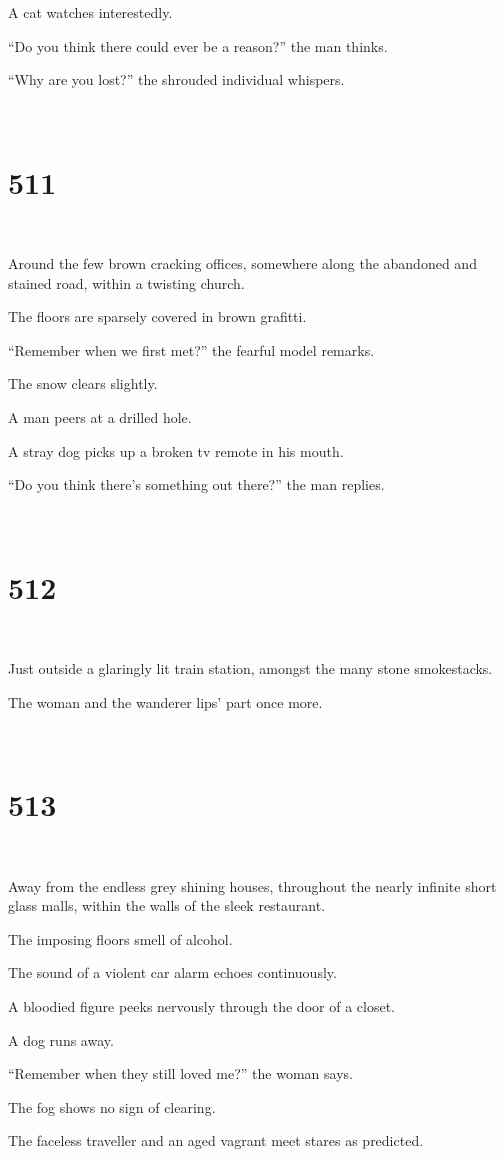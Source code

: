 \documentclass{report}
\begin{document}
A cat watches interestedly.

``Do you think there could ever be a reason?'' the man thinks.

``Why are you lost?'' the shrouded individual whispers.

~
\chapter*{511}
~

Around the few brown cracking offices, somewhere along the abandoned and stained road, within a twisting church.

The floors are sparsely covered in brown grafitti.

``Remember when we first met?'' the fearful model remarks.

The snow clears slightly.

A man peers at a drilled hole.

A stray dog picks up a broken tv remote in his mouth.

``Do you think there's something out there?'' the man replies.

~
\chapter*{512}
~

Just outside a glaringly lit train station, amongst the many stone smokestacks.

The woman and the wanderer lips' part once more.

~
\chapter*{513}
~

Away from the endless grey shining houses, throughout the nearly infinite short glass malls, within the walls of the sleek restaurant.

The imposing floors smell of alcohol.

The sound of a violent car alarm echoes continuously.

A bloodied figure peeks nervously through the door of a closet.

A dog runs away.

``Remember when they still loved me?'' the woman says.

The fog shows no sign of clearing.

The faceless traveller and an aged vagrant meet stares as predicted.
\end{document}
